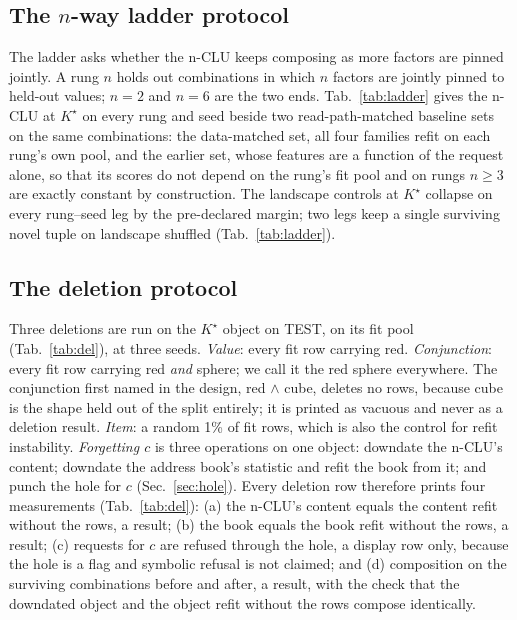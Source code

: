 \documentclass{article} %
\newcommand{\Kstar}{\ensuremath{K^{\star}}}
\begin{document}
\subsection{The $n$-way ladder protocol}

The ladder asks whether the n-CLU keeps composing as more factors are pinned jointly. A rung
$n$ holds out combinations in which $n$ factors are jointly pinned to held-out values; $n=2$ and
$n=6$ are the two ends. Tab.~\ref{tab:ladder} gives the n-CLU at $\Kstar$ on every rung and
seed beside two read-path-matched baseline sets on the same combinations: the data-matched set, all four
families refit on each rung's own pool, and the earlier set, whose features %
are a function of the request alone, so that its scores do not depend on the rung's fit pool and on
rungs $n\ge3$ are exactly constant by construction. %
The landscape controls at $\Kstar$ collapse on every rung--seed leg by the pre-declared margin;
two legs keep a single surviving novel tuple on
landscape shuffled (Tab.~\ref{tab:ladder}). %

\subsection{The deletion protocol}

Three deletions are run on the $\Kstar$ object on TEST, on its fit pool (Tab.~\ref{tab:del}), at three %
seeds. \emph{Value}: every fit row carrying red. \emph{Conjunction}: every fit row carrying red
\emph{and} sphere; we call it the red sphere everywhere. The conjunction first named in the design,
red $\wedge$ cube, deletes no rows, because cube is the shape held out of the split entirely; it is
printed as vacuous and never as a deletion result. \emph{Item}: a random 1\% of fit rows, which is
also the control for refit instability. \emph{Forgetting $c$} is three operations on one object:
downdate the n-CLU's content; downdate the address book's statistic and refit the book from it; and punch the
hole for $c$ (Sec.~\ref{sec:hole}). Every deletion row therefore prints four measurements
(Tab.~\ref{tab:del}): (a) the n-CLU's content equals the content refit without the rows, a result; (b) the book
equals the book refit without the rows, a result; (c) requests for $c$ are refused through the hole,
a display row only, because the hole is a flag and symbolic refusal is not claimed; and (d)
composition on the surviving combinations before and after, a result, with the check that the downdated
object and the object refit without the rows compose identically.
\end{document}

